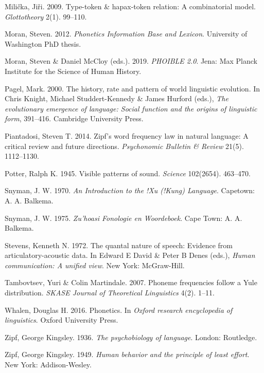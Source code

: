 \documentclass[
]{article}
\newlength{\cslhangindent}
\newlength{\cslentryspacingunit} %
\newenvironment{CSLReferences}[2] %
 {%
  \setlength{\parindent}{0pt}
  \ifodd #1
  \let\oldpar\par
  \def\par{\hangindent=\cslhangindent\oldpar}
  \fi
  \setlength{\parskip}{#2\cslentryspacingunit}
 }%
 {}
\begin{document}
\begin{CSLReferences}{1}{0}
\leavevmode{}%
Milička, Jiři. 2009. Type-token \& hapax-token relation: A combinatorial
model. \emph{Glottotheory} 2(1). 99--110.

\leavevmode{}%
Moran, Steven. 2012. \emph{{Phonetics Information Base and Lexicon}}.
University of Washington PhD thesis.

\leavevmode{}%
Moran, Steven \& Daniel McCloy (eds.). 2019. \emph{{PHOIBLE 2.0}}. Jena:
Max Planck Institute for the Science of Human History.

\leavevmode{}%
Pagel, Mark. 2000. The history, rate and pattern of world linguistic
evolution. In Chris Knight, Michael Studdert-Kennedy \& James Hurford
(eds.), \emph{The evolutionary emergence of language: Social function
and the origins of linguistic form}, 391--416. Cambridge University
Press.

\leavevmode{}%
Piantadosi, Steven T. 2014. Zipf's word frequency law in natural
language: A critical review and future directions. \emph{Psychonomic
Bulletin \& Review} 21(5). 1112--1130.

\leavevmode{}%
Potter, Ralph K. 1945. Visible patterns of sound. \emph{Science}
102(2654). 463--470.

\leavevmode{}%
Snyman, J. W. 1970. \emph{{An Introduction to the !Xu (!Kung)
Language}}. Capetown: A. A. Balkema.

\leavevmode{}%
Snyman, J. W. 1975. \emph{{Zu\textbar'hoasi Fonologie en Woordeboek}}.
Cape Town: A. A. Balkema.

\leavevmode{}%
Stevens, Kenneth N. 1972. The quantal nature of speech: Evidence from
articulatory-acoustic data. In Edward E David \& Peter B Denes (eds.),
\emph{Human communication: A unified view}. New York: McGraw-Hill.

\leavevmode{}%
Tambovtsev, Yuri \& Colin Martindale. 2007. Phoneme frequencies follow a
{Yule} distribution. \emph{SKASE Journal of Theoretical Linguistics}
4(2). 1--11.

\leavevmode{}%
Whalen, Douglas H. 2016. Phonetics. In \emph{Oxford research
encyclopedia of linguistics}. Oxford University Press.

\leavevmode{}%
Zipf, George Kingsley. 1936. \emph{The psychobiology of language}.
London: Routledge.

\leavevmode{}%
Zipf, George Kingsley. 1949. \emph{Human behavior and the principle of
least effort}. New York: Addison-Wesley.

\end{CSLReferences}
\end{document}
